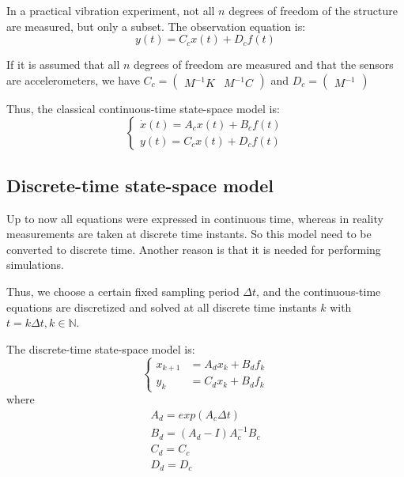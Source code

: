 \documentclass[journal]{IEEEtran}
\begin{document}
In a practical vibration experiment, not all $n$ degrees of freedom of the structure are measured, but only
a subset. The observation equation is:
\begin{equation}
y(t) = C_cx(t) + D_cf(t)
\end{equation}

If it is assumed that all $n$ degrees of freedom are measured and that the sensors are accelerometers, we have
$C_c =
\begin{pmatrix}
M^{-1}K & M^{-1}C
\end{pmatrix}$
and
$D_c=
\begin{pmatrix}
M^{-1}
\end{pmatrix}$

Thus, the classical continuous-time state-space model is:
\begin{equation}
\left\{
\begin{array}{ll}
\dot{x}(t) = A_cx(t) + B_cf(t) \\
y(t) = C_cx(t) + D_cf(t)
\end{array}
\right.
\end{equation}

\subsection{Discrete-time state-space model} %

Up to now all equations were expressed in continuous time, whereas in reality
measurements are taken at discrete time instants.
So this model need to be converted to discrete time.
Another reason is that it is needed for performing simulations.

Thus, we choose a certain fixed sampling period $\Delta t$, and the continuous-time equations are discretized and solved at all
discrete time instants $k$ with $t = k \Delta t, k \in \mathbb{N}$.

The discrete-time state-space model is:
\begin{equation}
\left\{
\begin{array}{ll}
x_{k+1} & = A_dx_k + B_df_k \\
y_k & = C_dx_k + B_df_k
\end{array}
\right.
\label{discrete}
\end{equation}
where
\begin{equation}
\begin{array}{ll}
A_d = exp(A_c \Delta t) \\
B_d= (A_d - I) A^{-1}_c B_c \\
C_d = C_c \\
D_d = D_c
\end{array}
\end{equation}
\end{document}
